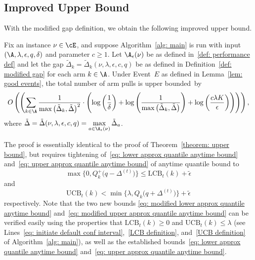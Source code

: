 \subsection{Improved Upper Bound}
With the modified gap definition, we obtain the following improved upper bound.

\begin{theorem}
\label{theorem: modified upper bound}
   Fix an instance $\nu \in \cE$, and suppose Algorithm~\ref{alg: main} is run with input $(\A, \lambda, \epsilon, q, \delta)$ and parameter $c \ge 1$.
    Let $\A_{\epsilon}(\nu) $ be as defined in~\eqref{def: performance def} and let the gap $\tilde{\Delta}_{k} = \tilde{\Delta}_{k}(\nu, \lambda, \epsilon, c, q)$ be as defined in Definition~\ref{def: modified gap} 
    for each arm $k \in \A$.
    Under Event~$E$ as defined in Lemma~\ref{lem: good events},
    the total number of arm pulls is upper bounded~by    
    \begin{equation}
        O
        \left(
        \left(
        \sum_{ k \in \A }
        \dfrac{1}{ \max\big( \tilde{\Delta}_{k},  \tilde{\Delta}  \big)^2} \cdot 
        \left( 
         \log \left(\frac{1}{ \delta } \right) +
         \log \left(\frac{1}{ \max\big( \tilde{\Delta}_{k},  \tilde{\Delta}  \big)}\right) +
         \log \left(\frac{c \lambda K}{ \epsilon } \right)    
        \right)
        \right)
        \right),
    \end{equation}
    where $\tilde{\Delta}  =  \tilde{\Delta}(\nu, \lambda, \epsilon, c, q) = \max\limits_{a \in \A_{\epsilon}(\nu)} \tilde{\Delta}_{a}$.
\end{theorem}

The proof is essentially identical to the proof of Theorem~\ref{theorem: upper bound}, but requires tightening of~\eqref{eq: lower approx quantile anytime bound} and~\eqref{eq: upper approx quantile anytime bound}
of anytime quantile bound to
    \begin{equation} 
    \label{eq: modified lower approx quantile anytime bound}
       \max\{0, Q^+_k\big(q -  \Delta^{(t)} \big) \}
        \le \mathrm{LCB}_t(k) + \tilde{\epsilon}
    \end{equation}
    and
    \begin{equation} 
    \label{eq: modified upper approx quantile anytime bound}
        \mathrm{UCB}_t(k) 
        <
         \min\{\lambda, Q_k\big(q + \Delta^{(t)} \big)\} + \tilde{\epsilon}
    \end{equation}
respectively.
Note that the two new bounds \eqref{eq: modified lower approx quantile anytime bound} and~\eqref{eq: modified upper approx quantile anytime bound} can be verified easily using the properties that $ \mathrm{LCB}_t(k) \ge 0$ and $ \mathrm{UCB}_t(k) \le \lambda$ (see Lines~\ref{eq: initiate default conf interval},~\ref{LCB definition}, and~\ref{UCB definition} of Algorithm~\ref{alg: main}), as well as the established bounds~\eqref{eq: lower approx quantile anytime bound} and~\eqref{eq: upper approx quantile anytime bound}.



